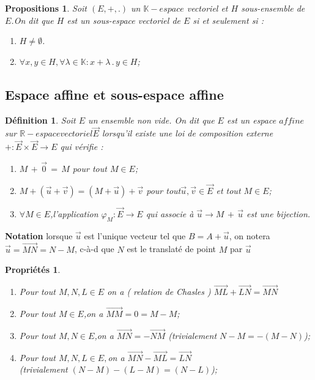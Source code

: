 \documentclass[12pt]{report}
\newtheorem{madef}{Définition}[section]
\newtheorem{propriété}{Propriétés}[section]
\newtheorem{propos}{Propositions}[section]
\begin{document}
\begin{propos}  Soit $(E,+,.)$ un $\mathbb{K}-espace$ vectoriel et $H$ sous-ensemble de $E$.On dit que $H$ est un sous-espace vectoriel de $E$ si et seulement si :
\begin{enumerate}
\item[1.] $H\neq\emptyset $.
\item[2.] $\forall x,y \in H, \forall \lambda \in \mathbb{K}:x+\lambda\,.\,y\in H$; 
\end{enumerate}  
\end{propos}
\subsection{Espace affine et sous-espace affine}
\begin{madef} Soit $E$ un ensemble non vide.
On dit que $E$ est un espace $affine$ sur $\mathbb{R}-espace vectoriel \vec{E}$ lorsqu'il existe une loi de composition externe $+:\vec{E}\times\vec{E}\longrightarrow E$ qui vérifie :
\begin{enumerate}
\item[1.] $M\,+\,\vec{0}\,=\,M$ pour tout $M \in E$;
\item[2.] $M+(\vec{u}+\vec{v})=(M+\vec{u})+\vec{v}$ pour tout$\vec{u},\vec{v}\in\vec{E}$ et tout $M\in E$; 
\item[3.] $\forall M \in E$,l'application $\varphi_{M}:\vec{E}\longrightarrow E$ qui associe à $\vec{u}\longrightarrow M\,+\,\vec{u}$ est une bijection. 
\end{enumerate}
\end{madef}
\textbf{Notation}  lorsque $\vec{u}$ est l'unique vecteur tel que $B=A+\vec{u}$, on notera $\vec{u}=\vec{MN}=N-M$, c-à-d que $N$ est le translaté de point $M$ par $\vec{u} $  
\begin{propriété}
\begin{enumerate}
 \item[i]   Pour tout $M,N,L\in E$ on a ( relation de Chasles ) $\vec{ML}+\vec{LN}=\vec{MN}$   
  \item[ii] Pour tout $M \in E$,on a $\vec{MM}=0=M-M$;
 \item[iii] Pour tout  $M,N \in E$,on a $\vec{MN}=-\vec{NM}$ (trivialement $N-M=-(M-N)$);
\item[iv]Pour tout $M,N,L \in E,$on a $\vec{MN}-\vec{ML}=\vec{LN}$\\
      (trivialement $(N-M)-(L-M)=(N-L)$);
\end{enumerate}
\end{propriété}
\end{document}
